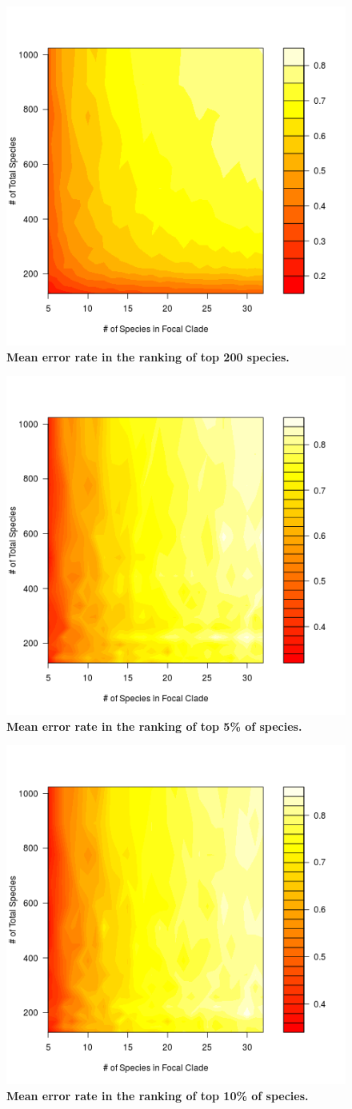 \documentclass[12pt,english]{article}
\begin{document}
\begin{figure}[!ht]
  \center
  \includegraphics[width=.5\textwidth]{errorRate200.png}
  \caption{\textbf{Mean error rate in the ranking of top 200 species.} }
\end{figure}

\begin{figure}[!ht]
  \center
  \includegraphics[width=.5\textwidth]{errorRate5pct.png}
  \caption{\textbf{Mean error rate in the ranking of top 5\% of species.} }
\end{figure}

\begin{figure}[!ht]
  \center
  \includegraphics[width=.5\textwidth]{errorRate10pct.png}
  \caption{\textbf{Mean error rate in the ranking of top 10\% of species.} }
\end{figure}
\end{document}
